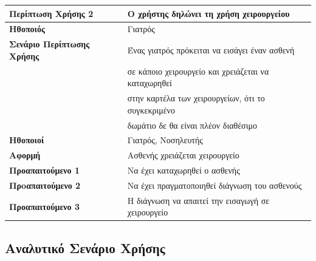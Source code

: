 \documentclass{article}
\newcommand\T{\rule{0pt}{2.6ex}}       %
\newcommand\B{\rule[-1.2ex]{0pt}{0pt}}
\begin{document}
\begin{center}
     \begin{tabular}{|l|l|}
     \hline
      \textbf{Περίπτωση Χρήσης 2 }   & Ο χρήστης δηλώνει τη χρήση χειρουργείου\T\B \\ 
      \hline
      \textbf{Ηθοποιός} & Γιατρός \T\B \\
      \hline
      \textbf{Σενάριο Περίπτωσης Χρήσης} & Ένας γιατρός πρόκειται να εισάγει έναν ασθενή\\& σε κάποιο χειρουργείο και χρειάζεται να καταχωρηθεί\\& στην καρτέλα των χειρουργείων, ότι το συγκεκριμένο\\& δωμάτιο δε θα είναι πλέον διαθέσιμο\T\B \\
      \hline
      \textbf{Ηθοποιοί} & Γιατρός, Νοσηλευτής \T\B \\
      \hline
      \textbf{Αφορμή} & Ασθενής χρειάζεται χειρουργείο\T\B \\
      \hline
      \textbf{Προαπαιτούμενο 1} & Να έχει καταχωρηθεί ο ασθενής \T\B \\
      \hline
      \textbf{Πρoαπαιτούμενο 2} & Να έχει πραγματοποιηθεί διάγνωση του ασθενούς \T\B \\
      \hline
      \textbf{Προαπαιτούμενο 3} & Η διάγνωση να απαιτεί την εισαγωγή σε χειρουργείο \T\B \\
      \hline
     \end{tabular}
 \end{center}
 
 \subsection{Αναλυτικό Σενάριο Χρήσης}
 
\end{document}

